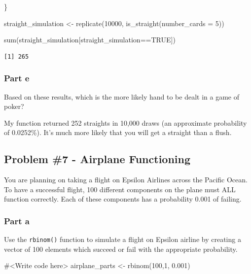 \documentclass[
  letterpaper,
  DIV=11,
  numbers=noendperiod]{scrartcl}
\newenvironment{Shaded}{\begin{snugshade}}{\end{snugshade}}
\newcommand{\AttributeTok}[1]{\textcolor[rgb]{0.40,0.45,0.13}{#1}}
\newcommand{\CommentTok}[1]{\textcolor[rgb]{0.37,0.37,0.37}{#1}}
\newcommand{\ConstantTok}[1]{\textcolor[rgb]{0.56,0.35,0.01}{#1}}
\newcommand{\DecValTok}[1]{\textcolor[rgb]{0.68,0.00,0.00}{#1}}
\newcommand{\FloatTok}[1]{\textcolor[rgb]{0.68,0.00,0.00}{#1}}
\newcommand{\FunctionTok}[1]{\textcolor[rgb]{0.28,0.35,0.67}{#1}}
\newcommand{\NormalTok}[1]{\textcolor[rgb]{0.00,0.23,0.31}{#1}}
\newcommand{\OtherTok}[1]{\textcolor[rgb]{0.00,0.23,0.31}{#1}}
\newcommand{\SpecialCharTok}[1]{\textcolor[rgb]{0.37,0.37,0.37}{#1}}
\begin{document}
\begin{Shaded}
\begin{Highlighting}[]
\NormalTok{\}}

\NormalTok{straight\_simulation }\OtherTok{\textless{}{-}} \FunctionTok{replicate}\NormalTok{(}\DecValTok{10000}\NormalTok{, }\FunctionTok{is\_straight}\NormalTok{(}\AttributeTok{number\_cards =} \DecValTok{5}\NormalTok{))}


\FunctionTok{sum}\NormalTok{(straight\_simulation[straight\_simulation}\SpecialCharTok{==}\ConstantTok{TRUE}\NormalTok{])}
\end{Highlighting}
\end{Shaded}

\begin{verbatim}
[1] 265
\end{verbatim}

\hypertarget{part-e}{%
\subsubsection{Part e}\label{part-e}}

Based on these results, which is the more likely hand to be dealt in a
game of poker?

My function returned 252 straights in 10,000 draws (an approximate
probability of 0.0252\%). It's much more likely that you will get a
straight than a flush.

\hypertarget{problem-7---airplane-functioning}{%
\subsection{Problem \#7 - Airplane
Functioning}\label{problem-7---airplane-functioning}}

You are planning on taking a flight on Epsilon Airlines across the
Pacific Ocean. To have a successful flight, 100 different components on
the plane must ALL function correctly. Each of these components has a
probability 0.001 of failing.

\hypertarget{part-a-6}{%
\subsubsection{Part a}\label{part-a-6}}

Use the \texttt{rbinom()} function to simulate a flight on Epsilon
airline by creating a vector of 100 elements which succeed or fail with
the appropriate probability.

\begin{Shaded}
\begin{Highlighting}[]
\CommentTok{\#\textless{}Write code here\textgreater{}}
\NormalTok{airplane\_parts }\OtherTok{\textless{}{-}} \FunctionTok{rbinom}\NormalTok{(}\DecValTok{100}\NormalTok{,}\DecValTok{1}\NormalTok{, }\FloatTok{0.001}\NormalTok{)}
\end{Highlighting}
\end{Shaded}
\end{document}
